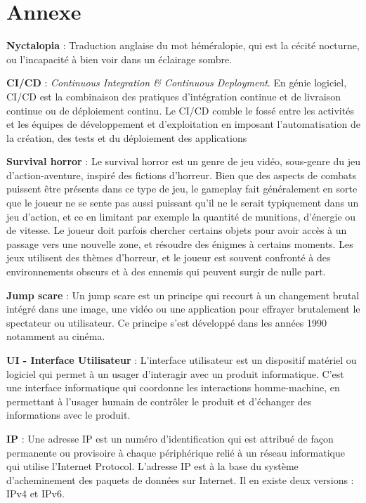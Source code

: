 \section{Annexe}

\noindent \textbf{Nyctalopia} : Traduction anglaise du mot héméralopie, qui est la cécité nocturne, ou l'incapacité à bien voir dans un éclairage sombre.

\noindent \textbf{CI/CD} : \emph{Continuous Integration \& Continuous Deployment}. En génie logiciel, CI/CD est la combinaison des pratiques d'intégration continue et de livraison continue ou de déploiement continu. Le CI/CD comble le fossé entre les activités et les équipes de développement et d'exploitation en imposant l'automatisation de la création, des tests et du déploiement des applications

\noindent \textbf{Survival horror} : Le survival horror est un genre de jeu vidéo, sous-genre du jeu d'action-aventure, inspiré des fictions d'horreur. Bien que des aspects de combats puissent être présents dans ce type de jeu, le gameplay fait généralement en sorte que le joueur ne se sente pas aussi puissant qu'il ne le serait typiquement dans un jeu d'action, et ce en limitant par exemple la quantité de munitions, d'énergie ou de vitesse. Le joueur doit parfois chercher certains objets pour avoir accès à un passage vers une nouvelle zone, et résoudre des énigmes à certains moments. Les jeux utilisent des thèmes d'horreur, et le joueur est souvent confronté à des environnements obscurs et à des ennemis qui peuvent surgir de nulle part.

\noindent \textbf{Jump scare} : Un jump scare est un principe qui recourt à un changement brutal intégré dans une image, une vidéo ou une application pour effrayer brutalement le spectateur ou utilisateur. Ce principe s'est développé dans les années 1990 notamment au cinéma.

\noindent \textbf{UI - Interface Utilisateur} : L’interface utilisateur est un dispositif matériel ou logiciel qui permet à un usager d'interagir avec un produit informatique. C'est une interface informatique qui coordonne les interactions homme-machine, en permettant à l'usager humain de contrôler le produit et d'échanger des informations avec le produit.

\noindent \textbf{IP} : Une adresse IP est un numéro d'identification qui est attribué de façon permanente ou provisoire à chaque périphérique relié à un réseau informatique qui utilise l'Internet Protocol. L'adresse IP est à la base du système d'acheminement des paquets de données sur Internet. Il en existe deux versions : IPv4 et IPv6.


